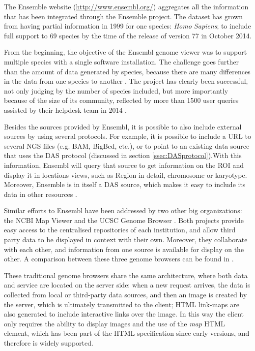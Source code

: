 The Ensemble website (\url{http://www.ensembl.org/}) aggregates all the information that has been integrated through the Ensemble project. The dataset has grown from having partial information in 1999 for one species: \emph{Homo Sapiens}; to include full support to 69 species by the time of the release of version 77 in October 2014. 

From the beginning, the objective of the Ensembl genome viewer was to support multiple species with a single software installation. The challenge goes further than the amount of data generated by species, because there are many differences in the data from one species to another \cite{STA2004}. The project has clearly been successful, not only judging by the number of species included, but more importantly because of the size of its community, reflected by more than 1500 user queries assisted by their helpdesk team in 2014 \cite{CUN2014}.

Besides the sources provided by Ensembl, it is possible to also include external sources by using several protocols. For example, it is possible to include a URL to several NGS files (e.g. BAM, BigBed, etc.), or to point to an existing data source that uses the DAS protocol (discussed in section \ref{ssec:DASprotocol}).With this information, Ensembl will query that source to get information on the ROI and display it in locations views, such as Region in detail, chromosome or karyotype. Moreover, Ensemble is in itself a DAS source, which makes it easy to include its data in other resources \cite{SPU2010}.

Similar efforts to Ensembl have been addressed by two other big organizations: the NCBI Map Viewer \cite{ACL2014} and the UCSC Genome Browser \cite{ROS2014}. Both projects provide easy access to the centralised repositories of each institution, and allow third party data to be displayed in context with their own. Moreover, they collaborate with each other, and information from one source is available for display on the other. A comparison between these three genome browsers can be found in \cite{FUR2006}.

These traditional genome browsers share the same architecture, where both data and service are located on the server side: when a new request arrives, the data is collected from local or third-party data sources, and then an image is created by the server, which is ultimately transmitted to the client; HTML link-maps are also generated to include interactive links over the image. In this way the client only requires the ability to display images and the use of the \emph{map} HTML element, which has been part of the HTML specification since early versions, and therefore is widely supported.

